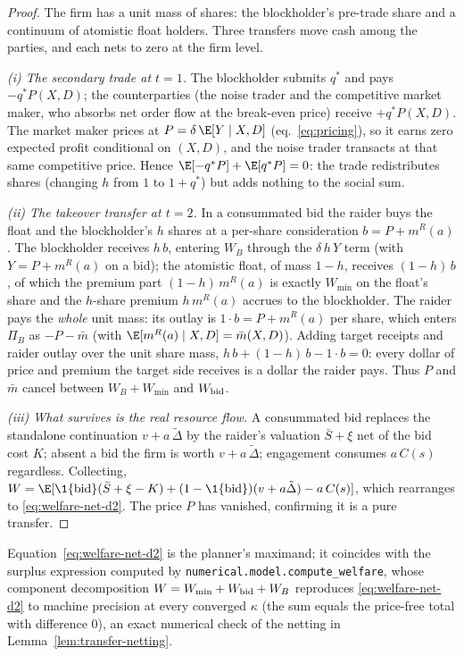 \begin{proof}
The firm has a unit mass of shares: the blockholder's pre-trade share and a
continuum of atomistic float holders. Three transfers move cash among the
parties, and each nets to zero at the firm level.

\emph{(i) The secondary trade at $t=1$.} The blockholder submits $q^{\ast}$ and
pays $-q^{\ast}P(X,D)$; the counterparties (the noise trader and the competitive
market maker, who absorbs net order flow at the break-even price) receive
$+q^{\ast}P(X,D)$. The market maker prices at $P=\delta\,\E[Y\mid X,D]$
(eq.~\eqref{eq:pricing}), so it earns zero expected profit conditional on
$(X,D)$, and the noise trader transacts at that same competitive price. Hence
$\E[-q^{\ast}P]+\E[q^{\ast}P]=0$: the trade redistributes shares (changing $h$
from $1$ to $1+q^{\ast}$) but adds nothing to the social sum.

\emph{(ii) The takeover transfer at $t=2$.} In a consummated bid the raider buys
the float and the blockholder's $h$ shares at a per-share consideration
$b=P+m^{R}(a)$. The blockholder receives $h\,b$, entering $W_B$ through the
$\delta\,h\,Y$ term (with $Y=P+m^R(a)$ on a bid); the atomistic float, of mass
$1-h$, receives $(1-h)\,b$, of which the premium part $(1-h)\,m^{R}(a)$ is exactly
$W_{\min}$ on the float's share and the $h$-share premium $h\,m^{R}(a)$ accrues
to the blockholder. The raider pays the \emph{whole} unit mass: its outlay is
$1\cdot b=P+m^{R}(a)$ per share, which enters $\Pi_B$ as $-P-\bar m$ (with
$\E[m^R(a)\mid X,D]=\bar m(X,D)$). Adding target receipts and raider outlay over
the unit share mass, $h\,b+(1-h)\,b-1\cdot b=0$: every dollar of price and
premium the target side receives is a dollar the raider pays. Thus $P$ and
$\bar m$ cancel between $W_B+W_{\min}$ and $W_{\textup{bid}}$.

\emph{(iii) What survives is the real resource flow.} A consummated bid replaces
the standalone continuation $v+a\,\tilde\Delta$ by the raider's valuation
$\bar S+\xi$ net of the bid cost $K$; absent a bid the firm is worth
$v+a\,\tilde\Delta$; engagement consumes $a\,C(s)$ regardless. Collecting,
$W=\E[\1\{\textup{bid}\}(\bar S+\xi-K)+(1-\1\{\textup{bid}\})(v+a\tilde\Delta)
   -a\,C(s)]$, which rearranges to \eqref{eq:welfare-net-d2}. The price $P$ has
vanished, confirming it is a pure transfer.
\end{proof}

Equation~\eqref{eq:welfare-net-d2} is the planner's maximand; it coincides with
the surplus expression computed by \texttt{numerical.model.compute\_welfare},
whose component decomposition $W=W_{\min}+W_{\textup{bid}}+W_B$ reproduces
\eqref{eq:welfare-net-d2} to machine precision at every converged $\kappa$ (the
sum equals the price-free total with difference $0$), an exact numerical check of
the netting in Lemma~\ref{lem:transfer-netting}.

